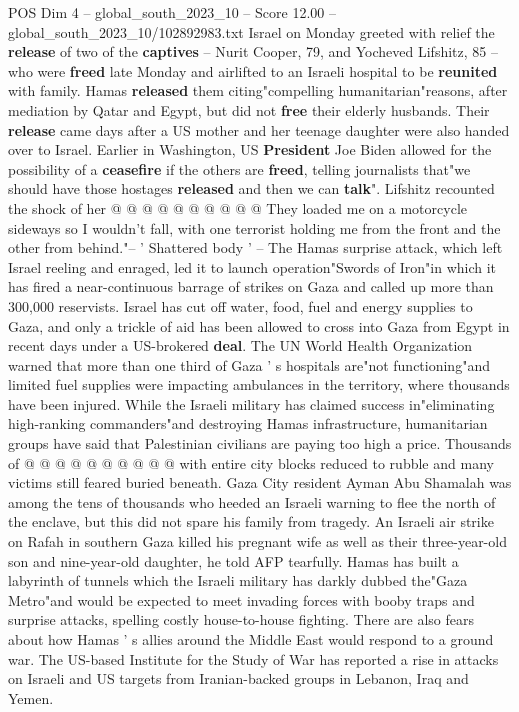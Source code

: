 \begin{textsample}{POS Dim 4 – global\_south\_2023\_10 – Score 12.00 – global\_south\_2023\_10/102892983.txt}
Israel on Monday greeted with relief the \textbf{release} of two of the \textbf{captives} -- Nurit Cooper, 79, and Yocheved Lifshitz, 85 -- who were \textbf{freed} late Monday and airlifted to an Israeli hospital to be \textbf{reunited} with family.
Hamas \textbf{released} them citing"compelling humanitarian"reasons, after mediation by Qatar and Egypt, but did not \textbf{free} their elderly husbands.
Their \textbf{release} came days after a US mother and her teenage daughter were also handed over to Israel.
Earlier in Washington, US \textbf{President} Joe Biden allowed for the possibility of a \textbf{ceasefire} if the others are \textbf{freed}, telling journalists that"we should have those hostages \textbf{released} and then we can \textbf{talk}".
Lifshitz recounted the shock of her @ @ @ @ @ @ @ @ @ @ They loaded me on a motorcycle sideways so I wouldn't fall, with one terrorist holding me from the front and the other from behind."-- ' Shattered body ' -- The Hamas surprise attack, which left Israel reeling and enraged, led it to launch operation"Swords of Iron"in which it has fired a near-continuous barrage of strikes on Gaza and called up more than 300,000 reservists.
Israel has cut off water, food, fuel and energy supplies to Gaza, and only a trickle of aid has been allowed to cross into Gaza from Egypt in recent days under a US-brokered \textbf{deal}.
The UN World Health Organization warned that more than one third of Gaza ' s hospitals are"not functioning"and limited fuel supplies were impacting ambulances in the territory, where thousands have been injured.
While the Israeli military has claimed success in"eliminating high-ranking commanders"and destroying Hamas infrastructure, humanitarian groups have said that Palestinian civilians are paying too high a price.
Thousands of @ @ @ @ @ @ @ @ @ @ with entire city blocks reduced to rubble and many victims still feared buried beneath.
Gaza City resident Ayman Abu Shamalah was among the tens of thousands who heeded an Israeli warning to flee the north of the enclave, but this did not spare his family from tragedy.
An Israeli air strike on Rafah in southern Gaza killed his pregnant wife as well as their three-year-old son and nine-year-old daughter, he told AFP tearfully.
Hamas has built a labyrinth of tunnels which the Israeli military has darkly dubbed the"Gaza Metro"and would be expected to meet invading forces with booby traps and surprise attacks, spelling costly house-to-house fighting.
There are also fears about how Hamas ' s allies around the Middle East would respond to a ground war.
The US-based Institute for the Study of War has reported a rise in attacks on Israeli and US targets from Iranian-backed groups in Lebanon, Iraq and Yemen.

\end{textsample}

